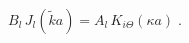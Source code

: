 \begin{equation}
 B_{l} \,  J_{l}  ({\tilde k} a )
= A_{l} \, K_{i \Theta}  (\kappa a)
\; .
\label{eq:continuity_ISP_2D_circular_well}
\end{equation}

